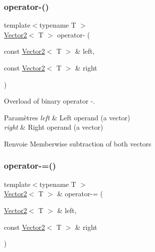 \subsubsection{\texorpdfstring{operator-\/()}{operator-()}\hspace{0.1cm}{\footnotesize\ttfamily [2/2]}}
{\footnotesize\ttfamily template$<$typename T $>$ \\
\hyperlink{classsf_1_1Vector2}{Vector2}$<$ T $>$ operator-\/ (\begin{DoxyParamCaption}\item[{const \hyperlink{classsf_1_1Vector2}{Vector2}$<$ T $>$ \&}]{left,  }\item[{const \hyperlink{classsf_1_1Vector2}{Vector2}$<$ T $>$ \&}]{right }\end{DoxyParamCaption})\hspace{0.3cm}{\ttfamily [related]}}



Overload of binary operator -\/. 


\begin{DoxyParams}{Paramètres}
{\em left} & Left operand (a vector) \\
\hline
{\em right} & Right operand (a vector)\\
\hline
\end{DoxyParams}
\begin{DoxyReturn}{Renvoie}
Memberwise subtraction of both vectors 
\end{DoxyReturn}
\mbox{\label{classsf_1_1Vector2_a30a5a12ad03c9a3a982a0a313bf84e6f}} 
\subsubsection{\texorpdfstring{operator-\/=()}{operator-=()}}
{\footnotesize\ttfamily template$<$typename T $>$ \\
\hyperlink{classsf_1_1Vector2}{Vector2}$<$ T $>$ \& operator-\/= (\begin{DoxyParamCaption}\item[{\hyperlink{classsf_1_1Vector2}{Vector2}$<$ T $>$ \&}]{left,  }\item[{const \hyperlink{classsf_1_1Vector2}{Vector2}$<$ T $>$ \&}]{right }\end{DoxyParamCaption})\hspace{0.3cm}{\ttfamily [related]}}



